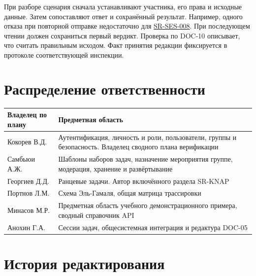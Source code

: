 \documentclass[12pt,a4paper]{article}
\newcounter{none} %
\begin{document}
При разборе сценария сначала устанавливают участника, его права и исходные данные. Затем сопоставляют ответ и сохранённый результат. Например, одного отказа при повторной отправке недостаточно для {\hyperlink{sr-ses-008}{SR-SES-008}}. При последующем чтении должен сохраниться первый вердикт. Проверка по DOC-10 описывает, что считать правильным исходом. Факт принятия редакции фиксируется в протоколе соответствующей инспекции.

\section{Распределение ответственности}\label{5-ux440ux430ux441ux43fux440ux435ux434ux435ux43bux435ux43dux438ux435-ux43eux442ux432ux435ux442ux441ux442ux432ux435ux43dux43dux43eux441ux442ux438}

\hypertarget{5-распределение-ответственности}{}

{\def\LTcaptype{none} %
\begin{longtable}[]{@{}
  >{\raggedright\arraybackslash}p{}
  >{\raggedright\arraybackslash}p{}@{}}
\toprule\noalign{}
\begin{minipage}[b]{\linewidth}\raggedright
Владелец по плану
\end{minipage} & \begin{minipage}[b]{\linewidth}\raggedright
Предметная область
\end{minipage} \\
\midrule\noalign{}
\endhead
\bottomrule\noalign{}
\endlastfoot
Кокорев В.Д. & Аутентификация, личность и роли, пользователи, группы и безопасность. Владелец сводного плана верификации \\
Самбьюи А.Ж. & Шаблоны наборов задач, назначение мероприятия группе, модерация, хранение и развёртывание \\
Георгиев Д.Д. & Ранцевые задачи. Автор включённого раздела SR-KNAP \\
Портнов Л.М. & Схема Эль-Гамаля, общая матрица трассировки \\
Минасов М.Р. & Предметная область учебного демонстрационного примера, сводный справочник API \\
Анохин Г.А. & Сессии задач, общесистемная интеграция и редактура DOC-05 \\
\end{longtable}
}

\section{История редактирования}\label{6-ux438ux441ux442ux43eux440ux438ux44f-ux440ux435ux434ux430ux43aux442ux438ux440ux43eux432ux430ux43dux438ux44f}
\end{document}
